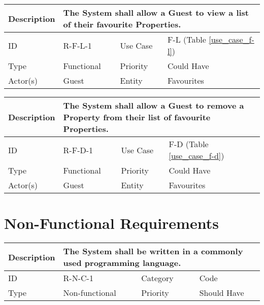 \begin{tabular}{|p{1.5cm}|p{1.5cm}|p{1.5cm}|p{1.5cm}|p{1.5cm}|p{1.5cm}|p{1.5cm}|p{1.5cm}|p{1.5cm}|p{1.5cm}|p{1.5cm}|p{1.5cm}|}
    \hline
    \multicolumn{2}{|o|}{Description} & \multicolumn{10}{p{12.5cm}|}{The System shall allow a Guest to view a list of their favourite Properties.} \\ \hline
    \multicolumn{2}{|o|}{ID}          & \multicolumn{4}{n}{R-F-L-1}            & \multicolumn{2}{|o|}{Use Case}    & \multicolumn{4}{n|}{F-L (Table \ref{use_case_f-l})} \\ \hline
    \multicolumn{2}{|o|}{Type}        & \multicolumn{4}{n}{Functional}         & \multicolumn{2}{|o|}{Priority}    & \multicolumn{4}{n|}{Could Have}  \\ \hline
    \multicolumn{2}{|o|}{Actor(s)}    & \multicolumn{4}{n}{Guest}              & \multicolumn{2}{|o|}{Entity}      & \multicolumn{4}{n|}{Favourites} \\ \hline
\end{tabular}

\begin{tabular}{|p{1.5cm}|p{1.5cm}|p{1.5cm}|p{1.5cm}|p{1.5cm}|p{1.5cm}|p{1.5cm}|p{1.5cm}|p{1.5cm}|p{1.5cm}|p{1.5cm}|p{1.5cm}|}
    \hline
    \multicolumn{2}{|o|}{Description} & \multicolumn{10}{p{12.5cm}|}{The System shall allow a Guest to remove a Property from their list of favourite Properties.} \\ \hline
    \multicolumn{2}{|o|}{ID}          & \multicolumn{4}{n}{R-F-D-1}            & \multicolumn{2}{|o|}{Use Case}    & \multicolumn{4}{n|}{F-D (Table \ref{use_case_f-d})} \\ \hline
    \multicolumn{2}{|o|}{Type}        & \multicolumn{4}{n}{Functional}         & \multicolumn{2}{|o|}{Priority}    & \multicolumn{4}{n|}{Could Have}  \\ \hline
    \multicolumn{2}{|o|}{Actor(s)}    & \multicolumn{4}{n}{Guest}              & \multicolumn{2}{|o|}{Entity}      & \multicolumn{4}{n|}{Favourites} \\ \hline
\end{tabular}

\section{Non-Functional Requirements}

\begin{tabular}{|p{1.5cm}|p{1.5cm}|p{1.5cm}|p{1.5cm}|p{1.5cm}|p{1.5cm}|p{1.5cm}|p{1.5cm}|p{1.5cm}|p{1.5cm}|p{1.5cm}|p{1.5cm}|}
    \hline
    \multicolumn{2}{|o|}{Description} & \multicolumn{10}{p{12.5cm}|}{The System shall be written in a commonly used programming language.} \\ \hline
    \multicolumn{2}{|o|}{ID}          & \multicolumn{4}{n}{R-N-C-1}            & \multicolumn{2}{|o|}{Category}    & \multicolumn{4}{n|}{Code} \\ \hline
    \multicolumn{2}{|o|}{Type}        & \multicolumn{4}{n}{Non-functional}     & \multicolumn{2}{|o|}{Priority}    & \multicolumn{4}{n|}{Should Have}  \\ \hline
\end{tabular}

